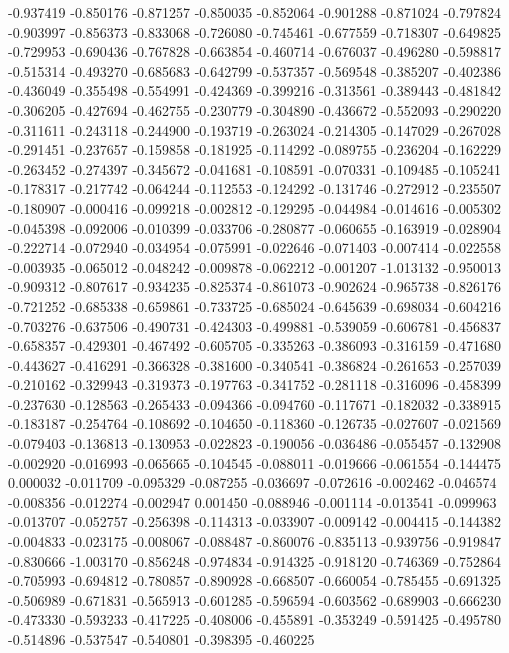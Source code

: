 -0.937419
-0.850176
-0.871257
-0.850035
-0.852064
-0.901288
-0.871024
-0.797824
-0.903997
-0.856373
-0.833068
-0.726080
-0.745461
-0.677559
-0.718307
-0.649825
-0.729953
-0.690436
-0.767828
-0.663854
-0.460714
-0.676037
-0.496280
-0.598817
-0.515314
-0.493270
-0.685683
-0.642799
-0.537357
-0.569548
-0.385207
-0.402386
-0.436049
-0.355498
-0.554991
-0.424369
-0.399216
-0.313561
-0.389443
-0.481842
-0.306205
-0.427694
-0.462755
-0.230779
-0.304890
-0.436672
-0.552093
-0.290220
-0.311611
-0.243118
-0.244900
-0.193719
-0.263024
-0.214305
-0.147029
-0.267028
-0.291451
-0.237657
-0.159858
-0.181925
-0.114292
-0.089755
-0.236204
-0.162229
-0.263452
-0.274397
-0.345672
-0.041681
-0.108591
-0.070331
-0.109485
-0.105241
-0.178317
-0.217742
-0.064244
-0.112553
-0.124292
-0.131746
-0.272912
-0.235507
-0.180907
-0.000416
-0.099218
-0.002812
-0.129295
-0.044984
-0.014616
-0.005302
-0.045398
-0.092006
-0.010399
-0.033706
-0.280877
-0.060655
-0.163919
-0.028904
-0.222714
-0.072940
-0.034954
-0.075991
-0.022646
-0.071403
-0.007414
-0.022558
-0.003935
-0.065012
-0.048242
-0.009878
-0.062212
-0.001207
-1.013132
-0.950013
-0.909312
-0.807617
-0.934235
-0.825374
-0.861073
-0.902624
-0.965738
-0.826176
-0.721252
-0.685338
-0.659861
-0.733725
-0.685024
-0.645639
-0.698034
-0.604216
-0.703276
-0.637506
-0.490731
-0.424303
-0.499881
-0.539059
-0.606781
-0.456837
-0.658357
-0.429301
-0.467492
-0.605705
-0.335263
-0.386093
-0.316159
-0.471680
-0.443627
-0.416291
-0.366328
-0.381600
-0.340541
-0.386824
-0.261653
-0.257039
-0.210162
-0.329943
-0.319373
-0.197763
-0.341752
-0.281118
-0.316096
-0.458399
-0.237630
-0.128563
-0.265433
-0.094366
-0.094760
-0.117671
-0.182032
-0.338915
-0.183187
-0.254764
-0.108692
-0.104650
-0.118360
-0.126735
-0.027607
-0.021569
-0.079403
-0.136813
-0.130953
-0.022823
-0.190056
-0.036486
-0.055457
-0.132908
-0.002920
-0.016993
-0.065665
-0.104545
-0.088011
-0.019666
-0.061554
-0.144475
0.000032
-0.011709
-0.095329
-0.087255
-0.036697
-0.072616
-0.002462
-0.046574
-0.008356
-0.012274
-0.002947
0.001450
-0.088946
-0.001114
-0.013541
-0.099963
-0.013707
-0.052757
-0.256398
-0.114313
-0.033907
-0.009142
-0.004415
-0.144382
-0.004833
-0.023175
-0.008067
-0.088487
-0.860076
-0.835113
-0.939756
-0.919847
-0.830666
-1.003170
-0.856248
-0.974834
-0.914325
-0.918120
-0.746369
-0.752864
-0.705993
-0.694812
-0.780857
-0.890928
-0.668507
-0.660054
-0.785455
-0.691325
-0.506989
-0.671831
-0.565913
-0.601285
-0.596594
-0.603562
-0.689903
-0.666230
-0.473330
-0.593233
-0.417225
-0.408006
-0.455891
-0.353249
-0.591425
-0.495780
-0.514896
-0.537547
-0.540801
-0.398395
-0.460225
